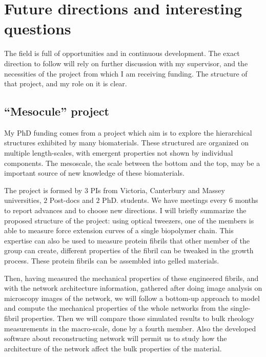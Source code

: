 \section{Future directions and interesting questions}

The field is full of opportunities and in continuous development. The exact
direction to follow will rely on further discussion with my supervisor, and the necessities
of the project from which I am receiving funding. The structure of that project,
and my role on it is clear.

\subsection{``Mesocule'' project}
My PhD funding comes from a project which aim is to explore the hierarchical
structures exhibited by many biomaterials. These structured are organized on
multiple length-scales, with emergent properties not shown by individual
components. The mesoscale, the scale between the bottom and the top, may be  a
important source of new knowledge of these biomaterials.

The project is formed by
$3$ PIs from Victoria, Canterbury and Massey universities, $2$ Post-docs
 and $2$ PhD. students. We have meetings every $6$ months to report advances and
 to choose new directions.
I will briefly summarize the proposed structure of the project: using optical
tweezers, one of the members is able to  measure force
extension curves of a single biopolymer chain. This expertise can also be  used
to measure protein fibrils that other member of the group can create,  different
properties of the fibril can be tweaked in the growth process. These protein
fibrils can be assembled into gelled materials.

Then, having measured the mechanical properties of these engineered
fibrils, and with the network architecture information, gathered after doing
image analysis on microscopy images of the network, we will follow a
bottom-up approach \citep{brown_multiscale_2009,schuster_investigating_2012} to
model and compute the mechanical properties of the whole networks from the single-fibril properties.
Then we will compare those simulated results to
bulk rheology measurements in the macro-scale, done by a fourth member.
Also the developed software about reconstructing network will permit us to 
study how the architecture of the network affect the bulk properties of the material.
 

